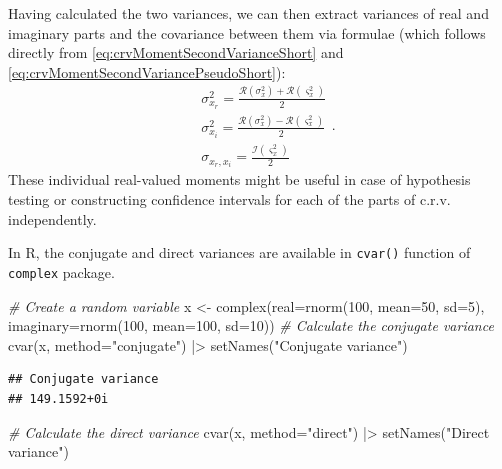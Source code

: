 \documentclass[
]{book}
\newenvironment{Shaded}{\begin{snugshade}}{\end{snugshade}}
\newcommand{\AttributeTok}[1]{\textcolor[rgb]{0.77,0.63,0.00}{#1}}
\newcommand{\CommentTok}[1]{\textcolor[rgb]{0.56,0.35,0.01}{\textit{#1}}}
\newcommand{\DecValTok}[1]{\textcolor[rgb]{0.00,0.00,0.81}{#1}}
\newcommand{\FunctionTok}[1]{\textcolor[rgb]{0.00,0.00,0.00}{#1}}
\newcommand{\NormalTok}[1]{#1}
\newcommand{\OtherTok}[1]{\textcolor[rgb]{0.56,0.35,0.01}{#1}}
\newcommand{\SpecialCharTok}[1]{\textcolor[rgb]{0.00,0.00,0.00}{#1}}
\newcommand{\StringTok}[1]{\textcolor[rgb]{0.31,0.60,0.02}{#1}}
\begin{document}
Having calculated the two variances, we can then extract variances of real and imaginary parts and the covariance between them via formulae (which follows directly from \eqref{eq:crvMomentSecondVarianceShort} and \eqref{eq:crvMomentSecondVariancePseudoShort}):
\begin{equation}
    \begin{aligned}
        & \sigma_{x_r}^2 = \frac{\mathcal{R}(\sigma^2_x) + \mathcal{R}(\varsigma^2_x)}{2} \\
        & \sigma_{x_i}^2 = \frac{\mathcal{R}(\sigma^2_x) - \mathcal{R}(\varsigma^2_x)}{2} \\
        & \sigma_{x_r,x_i} = \frac{\mathcal{I}(\varsigma^2_x)}{2}
    \end{aligned} .
    \label{eq:IndividualVariances}
\end{equation}
These individual real-valued moments might be useful in case of hypothesis testing or constructing confidence intervals for each of the parts of c.r.v. independently.

In R, the conjugate and direct variances are available in \texttt{cvar()} function of \texttt{complex} package.

\begin{Shaded}
\begin{Highlighting}[]
\CommentTok{\# Create a random variable}
\NormalTok{x }\OtherTok{\textless{}{-}} \FunctionTok{complex}\NormalTok{(}\AttributeTok{real=}\FunctionTok{rnorm}\NormalTok{(}\DecValTok{100}\NormalTok{, }\AttributeTok{mean=}\DecValTok{50}\NormalTok{, }\AttributeTok{sd=}\DecValTok{5}\NormalTok{),}
             \AttributeTok{imaginary=}\FunctionTok{rnorm}\NormalTok{(}\DecValTok{100}\NormalTok{, }\AttributeTok{mean=}\DecValTok{100}\NormalTok{, }\AttributeTok{sd=}\DecValTok{10}\NormalTok{))}
\CommentTok{\# Calculate the conjugate variance}
\FunctionTok{cvar}\NormalTok{(x, }\AttributeTok{method=}\StringTok{"conjugate"}\NormalTok{) }\SpecialCharTok{|\textgreater{}}
    \FunctionTok{setNames}\NormalTok{(}\StringTok{"Conjugate variance"}\NormalTok{)}
\end{Highlighting}
\end{Shaded}

\begin{verbatim}
## Conjugate variance 
## 149.1592+0i
\end{verbatim}

\begin{Shaded}
\begin{Highlighting}[]
\CommentTok{\# Calculate the direct variance}
\FunctionTok{cvar}\NormalTok{(x, }\AttributeTok{method=}\StringTok{"direct"}\NormalTok{) }\SpecialCharTok{|\textgreater{}}
    \FunctionTok{setNames}\NormalTok{(}\StringTok{"Direct variance"}\NormalTok{)}
\end{Highlighting}
\end{Shaded}
\end{document}
